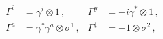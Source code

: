 \begin{equation}
\label{clif2}
\begin{aligned}
\Gamma^{i} &= \gamma^{i}\otimes 1\,, & 
  \Gamma^{y} &= -i\gamma^{*}\otimes 1\,,\\[1ex]
\Gamma^{a} &= \gamma^{*}\gamma^{a}\otimes\sigma^{1}\,, &
  \Gamma^{\underline{1}} &= -1\otimes \sigma^{2}\,,
\end{aligned}
\end{equation}

